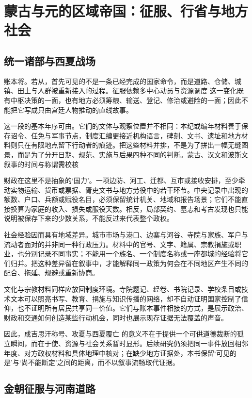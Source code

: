 \section{蒙古与元的区域帝国：征服、行省与地方社会}

\subsection{统一诸部与西夏战场}

账本将。若从，首先可见的不是一条已经完成的国家命令，而是道路、仓储、城镇、田土与人群被重新接入的过程。征服依赖多中心动员与资源调度 这一变化既有中枢决策的一面，也有地方必须筹粮、输送、登记、修治或避险的一面；因此不能把它写成只由宫廷人物推动的直线故事。

这一段的基本年序可由。它们的文体与观察位置并不相同：本纪或编年材料善于保存诏令、任免与军事节点，制度汇编更接近机构语言，碑刻、文书、遗址和地方材料则只在有限地点留下行动者的痕迹。把这些材料并排，不是为了拼出一幅无缝图景，而是为了分开日期、规范、实施与后果四种不同的判断。蒙古、汉文和波斯文叙事的时间与称谓需校核

财政在这里不是抽象的‘国力’。一项边防、河工、迁都、互市或接收安排，至少牵动实物运输、货币或票据、胥吏文书与地方劳役中的若干环节。中央记录中出现的额数、户口、兵额或赋役名目，必须保留统计机关、地域和报告场景；它们不能直接换算为家庭的收入、损失或服役天数。相反，局部契约、墓志和考古发现也只能说明被保存下来的少数关系，不能反过来代表整个政权。

社会经验因而具有地域差异。城市市场与港口、边寨与河谷、寺院与家族、军户与流动者面对的并非同一种行政压力。材料中的官号、文字、籍属、宗教捐施或职业，也分别记录不同事实；不能用一个族名、一个制度名称或一座都城的经验将它们归并。把这种差异留在叙事中，才能解释同一政策为何会在不同地区产生不同的配合、拖延、规避或重新协商。

文化与宗教材料同样应放回制度环境。寺院题记、经卷、书院记录、学校条目或技术文本可以照亮书写、教育、捐施与知识传播的网络，却不自动证明国家控制了信仰，也不证明所有居民共享同一价值。它们与账本事件相接的方式，是展示政治、财政和交通如何创造某些行动机会，同时也展示现存证据无法覆盖的声音。

因此，成吉思汗称号、攻夏与西夏覆亡 的意义不在于提供一个可供道德裁断的孤立瞬间，而在于使、资源与社会关系暂时显形。后续研究仍须把同一事件放回相邻年度、对方政权材料和具体地理中核对；在缺少地方证据处，本书保留‘可见的是’与‘尚不能断定’之间的距离，而不以叙事流畅取代证据。

\subsection{金朝征服与河南道路}

